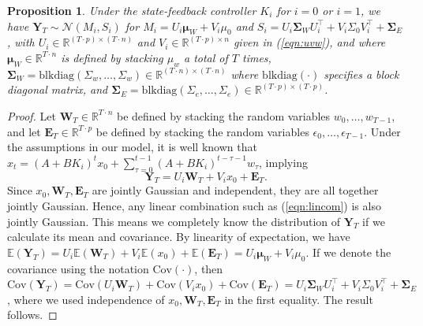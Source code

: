 \documentclass[10pt,a4paper]{amsart}
\newtheorem{proposition}{Proposition}
\begin{document}
\begin{proposition}
\label{prop:ytdist}
    Under the state-feedback controller $K_i$ for $i = 0$ or $i = 1$, we have $\mathbf{Y}_T \sim \mathcal{N}(M_i, S_i)$ for $M_i = U_i\boldsymbol{\mu}_W + V_i\mu_0$ and $S_i = U_i\mathbf{\Sigma}_WU_i^\top + V_i\Sigma_0V_i^\top + \mathbf{\Sigma}_E$, with $U_i\in\mathbb{R}^{(T\cdot p)\times(T\cdot n)}$ and $V_i \in \mathbb{R}^{(T\cdot p)\times n}$ given in (\ref{eqn:uvw}), and where $\boldsymbol{\mu}_W \in \mathbb{R}^{T\cdot n}$ is defined by stacking $\mu_w$ a total of $T$ times, $\mathbf{\Sigma}_W = \textrm{blkdiag}(\Sigma_w, \ldots, \Sigma_w) \in \mathbb{R}^{(T\cdot n)\times(T\cdot n)}$ where $\textrm{blkdiag}(\cdot)$ specifies a block diagonal matrix, and $\mathbf{\Sigma}_E = \textrm{blkdiag}(\Sigma_e, \ldots,\Sigma_e) \in \mathbb{R}^{(T\cdot p)\times(T\cdot p)}$.
\end{proposition}

\begin{proof}
    Let $\mathbf{W}_T \in \mathbb{R}^{T\cdot n}$ be defined by stacking the random variables $w_0,\ldots,w_{T-1}$, and let $\mathbf{E}_T \in \mathbb{R}^{T\cdot p}$ be defined by stacking the random variables $\epsilon_0,\ldots,\epsilon_{T-1}$. Under the assumptions in our model, it is well known that $x_{t} = (A+BK_i)^tx_0 + \sum_{\tau = 0}^{t-1}(A+BK_i)^{t-\tau-1}w_\tau$, implying
    \begin{equation}
        \mathbf{Y}_T = U_i\mathbf{W}_T + V_ix_0 + \mathbf{E}_T.\label{eqn:lincom}
    \end{equation} 
    Since $x_0, \mathbf{W}_T, \mathbf{E}_T$ are jointly Gaussian and independent, they are all together jointly Gaussian. Hence, any linear combination such as (\ref{eqn:lincom}) is also jointly Gaussian. This means we completely know the distribution of $\mathbf{Y}_T$ if we calculate its mean and covariance. By linearity of expectation, we have $\mathbb{E}(\mathbf{Y}_T) = U_i\mathbb{E}(\mathbf{W}_T) + V_i\mathbb{E}(x_0) + \mathbb{E}(\mathbf{E}_T) = 
        U_i\boldsymbol{\mu}_W + V_i\mu_0$. If we denote the covariance using the notation $\textrm{Cov}(\cdot)$, then $\textrm{Cov}(\mathbf{Y}_T) = \textrm{Cov}(U_i\mathbf{W}_T) + \textrm{Cov}(V_ix_0) + \textrm{Cov}(\mathbf{E}_T) = 
        U_i\mathbf{\Sigma}_WU_i^\top + V_i\Sigma_0V_i^\top + \mathbf{\Sigma}_E$, where we used independence of $x_0,\mathbf{W}_T,\mathbf{E}_T$ in the first equality. The result follows.
\end{proof}
\end{document}
